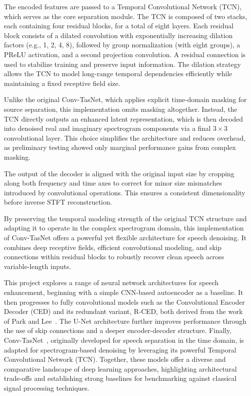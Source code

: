 The encoded features are passed to a Temporal Convolutional Network (TCN), which serves as the core separation module. The TCN is composed of two stacks, each containing four residual blocks, for a total of eight layers. Each residual block consists of a dilated convolution with exponentially increasing dilation factors (e.g., 1, 2, 4, 8), followed by group normalization (with eight groups), a PReLU activation, and a second projection convolution. A residual connection is used to stabilize training and preserve input information. The dilation strategy allows the TCN to model long-range temporal dependencies efficiently while maintaining a fixed receptive field size.

Unlike the original Conv-TasNet, which applies explicit time-domain masking for source separation, this implementation omits masking altogether. Instead, the TCN directly outputs an enhanced latent representation, which is then decoded into denoised real and imaginary spectrogram components via a final \(3 \times 3\) convolutional layer. This choice simplifies the architecture and reduces overhead, as preliminary testing showed only marginal performance gains from complex masking.

The output of the decoder is aligned with the original input size by cropping along both frequency and time axes to correct for minor size mismatches introduced by convolutional operations. This ensures a consistent dimensionality before inverse STFT reconstruction.

By preserving the temporal modeling strength of the original TCN structure and adapting it to operate in the complex spectrogram domain, this implementation of Conv-TasNet offers a powerful yet flexible architecture for speech denoising. It combines deep receptive fields, efficient convolutional modeling, and skip connections within residual blocks to robustly recover clean speech across variable-length inputs.

\vspace{2em}
This project explores a range of neural network architectures for speech enhancement, beginning with a simple CNN-based autoencoder as a baseline. It then progresses to fully convolutional models such as the Convolutional Encoder Decoder (CED) and its redundant variant, R-CED, both derived from the work of Park and Lee~\cite{park2017acoustic}. The U-Net architecture further improves performance through the use of skip connections and a deeper encoder-decoder structure. Finally, Conv-TasNet~\cite{luo2019conv}, originally developed for speech separation in the time domain, is adapted for spectrogram-based denoising by leveraging its powerful Temporal Convolutional Network (TCN). Together, these models offer a diverse and comparative landscape of deep learning approaches, highlighting architectural trade-offs and establishing strong baselines for benchmarking against classical signal processing techniques.


